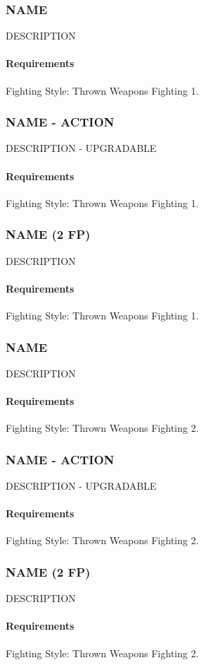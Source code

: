 \subsubsection{NAME} \label{feat::name}
    DESCRIPTION
    \paragraph{Requirements} Fighting Style: Thrown Weapons Fighting 1.
\subsubsection{NAME - ACTION} \label{feat::name}
    DESCRIPTION - UPGRADABLE
    \paragraph{Requirements} Fighting Style: Thrown Weapons Fighting 1.
\subsubsection{NAME (2 FP)} \label{feat::name}
    DESCRIPTION
    \paragraph{Requirements} Fighting Style: Thrown Weapons Fighting 1.
\subsubsection{NAME} \label{feat::name}
    DESCRIPTION
    \paragraph{Requirements} Fighting Style: Thrown Weapons Fighting 2.
\subsubsection{NAME - ACTION} \label{feat::name}
    DESCRIPTION - UPGRADABLE
    \paragraph{Requirements} Fighting Style: Thrown Weapons Fighting 2.
\subsubsection{NAME (2 FP)} \label{feat::name}
    DESCRIPTION
    \paragraph{Requirements} Fighting Style: Thrown Weapons Fighting 2.
